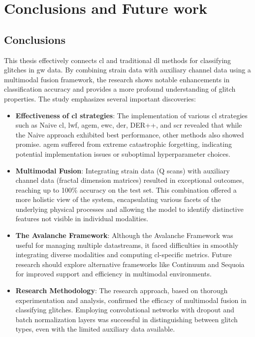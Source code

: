 \chapter{Conclusions and Future work}
\label{ch:6}
\section{Conclusions}
This thesis effectively connects \acrshort{cl} and traditional \acrshort{dl} methods for classifying glitches in \acrshort{gw} data. By combining strain data with auxiliary channel data using a multimodal fusion framework, the research shows notable enhancements in classification accuracy and provides a more profound understanding of glitch properties. The study emphasizes several important discoveries: 
\begin{itemize}
    \item \textbf{Effectiveness of \acrshort{cl} strategies}: The implementation of various \acrshort{cl} strategies such as Naive \acrshort{cl}, \acrfull{lwf}, \acrfull{agem}, \acrfull{ewc}, \acrfull{der}, DER++, and \acrfull{scr} revealed that while the Naive approach exhibited best performance, other methods also showed promise. \acrshort{agem} suffered from extreme catastrophic forgetting, indicating potential implementation issues or suboptimal hyperparameter choices. 
    \item \textbf{Multimodal Fusion}: Integrating strain data (Q scans) with auxiliary channel data (fractal dimension matrices) resulted in exceptional outcomes, reaching up to 100\% accuracy on the test set. This combination offered a more holistic view of the system, encapsulating various facets of the underlying physical processes and allowing the model to identify distinctive features not visible in individual modalities. 
    \item \textbf{The Avalanche Framework}: Although the Avalanche Framework was useful for managing multiple datastreams, it faced difficulties in smoothly integrating diverse modalities and computing \acrshort{cl}-specific metrics. Future research should explore alternative frameworks like Continuum and Sequoia for improved support and efficiency in multimodal environments. 
    \item \textbf{Research Methodology}: The research approach, based on thorough experimentation and analysis, confirmed the efficacy of multimodal fusion in classifying glitches. Employing convolutional networks with dropout and batch normalization layers was successful in distinguishing between glitch types, even with the limited auxiliary data available. 
\end{itemize}

